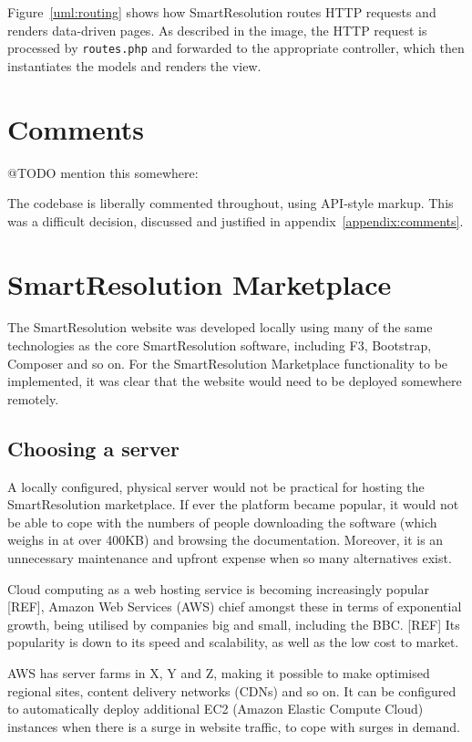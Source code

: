 Figure~\ref{uml:routing} shows how SmartResolution routes HTTP requests and renders data-driven pages. As described in the image, the HTTP request is processed by \lstinline{routes.php} and forwarded to the appropriate controller, which then instantiates the models and renders the view.

\section{Comments}

@TODO mention this somewhere:

The codebase is liberally commented throughout, using API-style markup. This was a difficult decision, discussed and justified in appendix~\ref{appendix:comments}.

\section{SmartResolution Marketplace}

The SmartResolution website was developed locally using many of the same technologies as the core SmartResolution software, including F3, Bootstrap, Composer and so on. For the SmartResolution Marketplace functionality to be implemented, it was clear that the website would need to be deployed somewhere remotely.

\subsection{Choosing a server}

A locally configured, physical server would not be practical for hosting the SmartResolution marketplace. If ever the platform became popular, it would not be able to cope with the numbers of people downloading the software (which weighs in at over 400KB) and browsing the documentation. Moreover, it is an unnecessary maintenance and upfront expense when so many alternatives exist.

Cloud computing as a web hosting service is becoming increasingly popular [REF], Amazon Web Services (AWS) chief amongst these in terms of exponential growth, being utilised by companies big and small, including the BBC. [REF] Its popularity is down to its speed and scalability, as well as the low cost to market.

AWS has server farms in X, Y and Z, making it possible to make optimised regional sites, content delivery networks (CDNs) and so on. It can be configured to automatically deploy additional EC2 (Amazon Elastic Compute Cloud) instances when there is a surge in website traffic, to cope with surges in demand.

